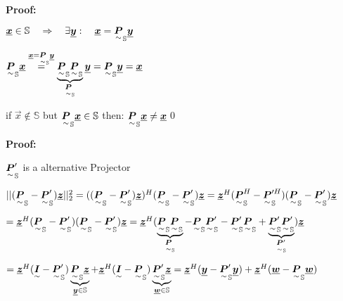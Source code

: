 


\textbf{Proof: }

$\vec{x}\in\mathbb{S} \pfeil \exists\vec{y}: \quad \vec{x}=\ma{P}_{\mathbb{S}}\vec{y}$

$\ma{P}_{\mathbb{S}}\vec{x} \overset{\vec{x}=\ma{P}_{\mathbb{S}}\vec{y}}{=}\underbrace{\ma{P}_{\mathbb{S}}\ma{P}_{\mathbb{S}}}_{\ma{P}_{\mathbb{S}}}\vec{y}=\ma{P}_{\mathbb{S}}\vec{y}=\vec{x}$


if $\vec{x}\notin\mathbb{S}$ but $\ma{P}_\mathbb{S}\vec{x}\in\mathbb{S}$ then: $\ma{P}_\mathbb{S}\vec{x}\neq\vec{x}$\qed



\textbf{Proof: }

$\ma{P}_\mathbb{S}'$ is a alternative Projector

$||(\ma{P}_\mathbb{S}-\ma{P}_\mathbb{S}')\vec{z} ||_2^2\\=((\ma{P}_\mathbb{S}-\ma{P}_\mathbb{S}')\vec{z})^H(\ma{P}_\mathbb{S}-\ma{P}_\mathbb{S}')\vec{z}
=\vec{z}^H(\ma{P}_\mathbb{S}^H-\ma{P}_\mathbb{S}'^H)(\ma{P}_\mathbb{S}-\ma{P}_\mathbb{S}')\vec{z}$

$=\vec{z}^H(\ma{P}_\mathbb{S}-\ma{P}_\mathbb{S}')(\ma{P}_\mathbb{S}-\ma{P}_\mathbb{S}')\vec{z}
=\vec{z}^H(\underbrace{\ma{P}_\mathbb{S}\ma{P}_\mathbb{S}}_{\ma{P}_\mathbb{S}}-\ma{P}_\mathbb{S}\ma{P}_\mathbb{S}'-\ma{P}_\mathbb{S}'\ma{P}_\mathbb{S}+\underbrace{\ma{P}_\mathbb{S}'\ma{P}_\mathbb{S}'}_{\ma{P}_\mathbb{S}'})\vec{z}$

$=\vec{z}^H(\ma{I}-\ma{P}_\mathbb{S}')\underbrace{\ma{P}_\mathbb{S}\vec{z}}_{\vec{y}\in\mathbb{S}}+\vec{z}^H(\ma{I}-\ma{P}_\mathbb{S})\underbrace{\ma{P}_\mathbb{S}'\vec{z}}_{\vec{w}\in\mathbb{S}}=
\vec{z}^H(\vec{y}-\ma{P}'_\mathbb{S}\vec{y})+\vec{z}^H(\vec{w}-\ma{P}_\mathbb{S}\vec{w})$

